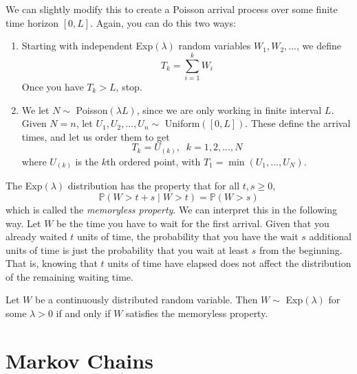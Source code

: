 \documentclass{article}
\begin{document}
    We can slightly modify this to create a Poisson arrival process over some finite time horizon $[0, L]$. Again, you can do this two ways: 
    \begin{enumerate}
      \item Starting with independent Exp$(\lambda)$ random variables $W_1, W_2, ...$, we define
      \begin{equation}
        T_k = \sum_{i=1}^k W_i
      \end{equation}
      Once you have $T_k > L$, stop. 
      \item We let $N \sim$ Poisson$(\lambda L)$, since we are only working in finite interval $L$. Given $N = n$, let $U_1, U_2, ..., U_n \sim$ Uniform$([0, L])$. These define the arrival times, and let us order them to get
      \begin{equation}
        T_k = U_{(k)}, \;\; k = 1, 2, ..., N
      \end{equation}
      where $U_{(k)}$ is the $k$th ordered point, with $T_1 = \min(U_1, ..., U_N)$. 
    \end{enumerate}

    \begin{lemma}
      The Exp$(\lambda)$ distribution has the property that for all $t, s \geq 0$, 
      \begin{equation}
        \mathbb{P}(W > t + s \; | \; W > t) = \mathbb{P}(W > s)
      \end{equation}
      which is called the \textit{memoryless property}. We can interpret this in the following way. Let $W$ be the time you have to wait for the first arrival. Given that you already waited $t$ units of time, the probability that you have the wait $s$ additional units of time is just the probability that you wait at least $s$ from the beginning. That is, knowing that $t$ units of time have elapsed does not affect the distribution of the remaining waiting time. 
    \end{lemma}

    \begin{theorem}
      Let $W$ be a continuously distributed random variable. Then $W \sim$ Exp$(\lambda)$ for some $\lambda > 0$ if and only if $W$ satisfies the memoryless property. 
    \end{theorem}

\section{Markov Chains}
\end{document}
